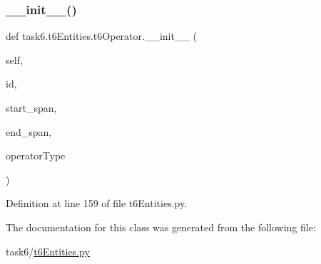 \subsubsection{\texorpdfstring{\+\_\+\+\_\+init\+\_\+\+\_\+()}{\_\_init\_\_()}}
{\footnotesize\ttfamily def task6.\+t6\+Entities.\+t6\+Operator.\+\_\+\+\_\+init\+\_\+\+\_\+ (\begin{DoxyParamCaption}\item[{}]{self,  }\item[{}]{id,  }\item[{}]{start\+\_\+span,  }\item[{}]{end\+\_\+span,  }\item[{}]{operator\+Type }\end{DoxyParamCaption})}



Definition at line 159 of file t6\+Entities.\+py.



The documentation for this class was generated from the following file\+:\begin{DoxyCompactItemize}
\item 
task6/\hyperlink{t6Entities_8py}{t6\+Entities.\+py}\end{DoxyCompactItemize}
